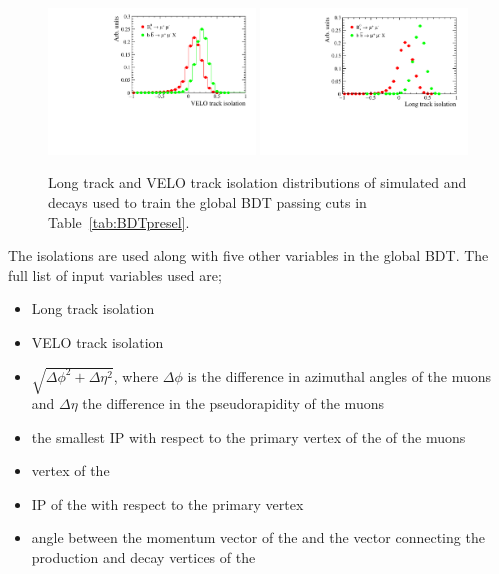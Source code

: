 \begin{figure}[htbp]
    \centering
        \includegraphics[width=0.49\textwidth]{./Figs/Selection/iso_velo_simulation_all.pdf}
              \includegraphics[width=0.49\textwidth]{./Figs/Selection/iso_lt_sim_all.pdf}
           \caption{Long track and VELO track isolation distributions of simulated \bsmumu and \bbbarmumux decays used to train the global BDT passing cuts in Table~\ref{tab:BDTpresel}.}
    \label{fig:Isolations}
\end{figure}

The isolations are used along with five other variables in the global BDT. The full list of input variables used are;
\begin{itemize}
\item Long track isolation
\item VELO track isolation
\item $\sqrt{\Delta \phi^{2} + \Delta \eta^{2}}$, where $\Delta \phi$ is the difference in azimuthal angles of the muons and $\Delta \eta$ the difference in the pseudorapidity of the muons
\item the smallest IP \chisqd with respect to the primary vertex of the \bsmumu of the muons
\item vertex \chisqd of the \bs
\item IP \chisqd of the \bs with respect to the primary vertex
\item angle between the momentum vector of the \bs and the vector connecting the production and decay vertices of the \bs
\end{itemize}

